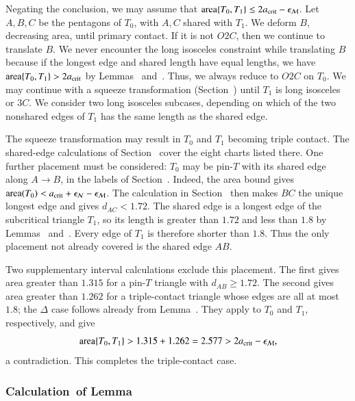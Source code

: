 Negating the conclusion, we may assume that
${\operatorname{area}}\{T_0,T_1\}\le2a_\text{crit}-\epsilon_{\mathcal M}$.  Let $A,B,C$ be the pentagons of $T_0$, with $A,C$
shared with $T_1$.  We deform $B$, decreasing area, until primary contact.  If it is not
$O2C$, then we continue to translate $B$.  We never encounter the long
isosceles constraint while translating $B$ because if the longest edge
and shared length have equal lengths, we have ${\operatorname{area}}\{T_0,T_1\} >
2a_\text{crit}$ by Lemmas~ and~.  Thus,
we always reduce to $O2C$ on $T_0$.  We may continue with a squeeze
transformation (Section~) until $T_1$ is long
isosceles or $3C$.  We consider two long isosceles subcases, depending
on which of the two nonshared edges of $T_1$ has the same length as the
shared edge.

The squeeze transformation may result in $T_0$ and $T_1$ becoming
triple contact. The shared-edge calculations of
Section~ cover the eight charts listed there.
One further placement must be considered: $T_0$ may be pin-$T$
with its shared edge along $A\to B$, in the labels of
Section~. Indeed, the area bound gives
${\operatorname{area}}(T_0)<a_\text{crit}+\epsilon_{\mathcal N}-\epsilon_{\mathcal M}$.
The calculation in Section~ then makes $BC$
the unique longest edge and gives $d_{AC}<1.72$.
The shared edge is a longest edge of the subcritical triangle
$T_1$, so its length is greater than $1.72$ and less than $1.8$
by Lemmas~ and~.
Every edge of $T_1$ is therefore shorter than $1.8$.
Thus the only placement not already covered is the shared edge $AB$.

Two supplementary interval calculations exclude this placement.
The first gives area greater than $1.315$ for a pin-$T$ triangle
with $d_{AB}\ge1.72$. The second gives area greater than $1.262$
for a triple-contact triangle whose edges are all at most $1.8$;
the $\Delta$ case follows already from Lemma~.
They apply to $T_0$ and $T_1$, respectively, and give
\[
{\operatorname{area}}\{T_0,T_1\}>1.315+1.262=2.577>2a_\text{crit}-\epsilon_{\mathcal M},
\]
a contradiction. This completes the triple-contact case.

\subsubsection{Calculation~of Lemma~}

